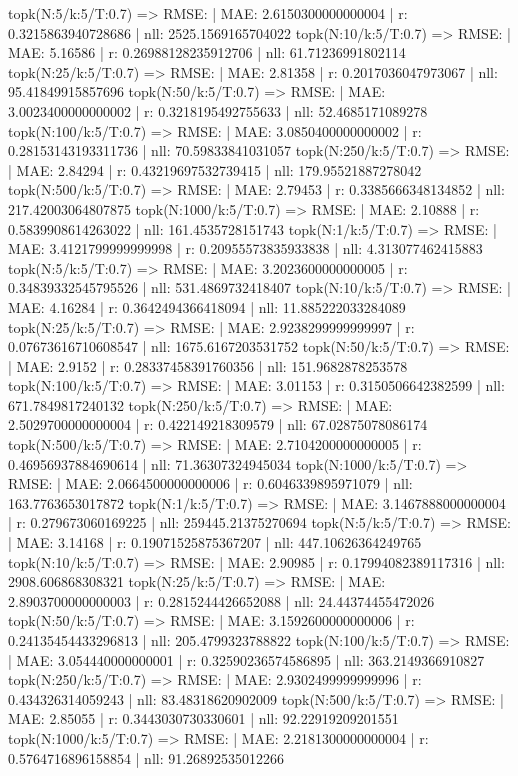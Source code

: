 topk(N:5/k:5/T:0.7) => RMSE: | MAE: 2.6150300000000004 | r: 0.3215863940728686 | nll: 2525.1569165704022
topk(N:10/k:5/T:0.7) => RMSE: | MAE: 5.16586 | r: 0.26988128235912706 | nll: 61.71236991802114
topk(N:25/k:5/T:0.7) => RMSE: | MAE: 2.81358 | r: 0.2017036047973067 | nll: 95.41849915857696
topk(N:50/k:5/T:0.7) => RMSE: | MAE: 3.0023400000000002 | r: 0.3218195492755633 | nll: 52.4685171089278
topk(N:100/k:5/T:0.7) => RMSE: | MAE: 3.0850400000000002 | r: 0.28153143193311736 | nll: 70.59833841031057
topk(N:250/k:5/T:0.7) => RMSE: | MAE: 2.84294 | r: 0.43219697532739415 | nll: 179.95521887278042
topk(N:500/k:5/T:0.7) => RMSE: | MAE: 2.79453 | r: 0.3385666348134852 | nll: 217.42003064807875
topk(N:1000/k:5/T:0.7) => RMSE: | MAE: 2.10888 | r: 0.5839908614263022 | nll: 161.4535728151743
topk(N:1/k:5/T:0.7) => RMSE: | MAE: 3.4121799999999998 | r: 0.20955573835933838 | nll: 4.313077462415883
topk(N:5/k:5/T:0.7) => RMSE: | MAE: 3.2023600000000005 | r: 0.34839332545795526 | nll: 531.4869732418407
topk(N:10/k:5/T:0.7) => RMSE: | MAE: 4.16284 | r: 0.3642494366418094 | nll: 11.885222033284089
topk(N:25/k:5/T:0.7) => RMSE: | MAE: 2.9238299999999997 | r: 0.07673616710608547 | nll: 1675.6167203531752
topk(N:50/k:5/T:0.7) => RMSE: | MAE: 2.9152 | r: 0.28337458391760356 | nll: 151.9682878253578
topk(N:100/k:5/T:0.7) => RMSE: | MAE: 3.01153 | r: 0.3150506642382599 | nll: 671.7849817240132
topk(N:250/k:5/T:0.7) => RMSE: | MAE: 2.5029700000000004 | r: 0.422149218309579 | nll: 67.02875078086174
topk(N:500/k:5/T:0.7) => RMSE: | MAE: 2.7104200000000005 | r: 0.46956937884690614 | nll: 71.36307324945034
topk(N:1000/k:5/T:0.7) => RMSE: | MAE: 2.0664500000000006 | r: 0.6046339895971079 | nll: 163.7763653017872
topk(N:1/k:5/T:0.7) => RMSE: | MAE: 3.1467888000000004 | r: 0.279673060169225 | nll: 259445.21375270694
topk(N:5/k:5/T:0.7) => RMSE: | MAE: 3.14168 | r: 0.19071525875367207 | nll: 447.10626364249765
topk(N:10/k:5/T:0.7) => RMSE: | MAE: 2.90985 | r: 0.17994082389117316 | nll: 2908.606868308321
topk(N:25/k:5/T:0.7) => RMSE: | MAE: 2.8903700000000003 | r: 0.2815244426652088 | nll: 24.44374455472026
topk(N:50/k:5/T:0.7) => RMSE: | MAE: 3.1592600000000006 | r: 0.24135454433296813 | nll: 205.4799323788822
topk(N:100/k:5/T:0.7) => RMSE: | MAE: 3.054440000000001 | r: 0.32590236574586895 | nll: 363.2149366910827
topk(N:250/k:5/T:0.7) => RMSE: | MAE: 2.9302499999999996 | r: 0.434326314059243 | nll: 83.48318620902009
topk(N:500/k:5/T:0.7) => RMSE: | MAE: 2.85055 | r: 0.3443030730330601 | nll: 92.22919209201551
topk(N:1000/k:5/T:0.7) => RMSE: | MAE: 2.2181300000000004 | r: 0.5764716896158854 | nll: 91.26892535012266

